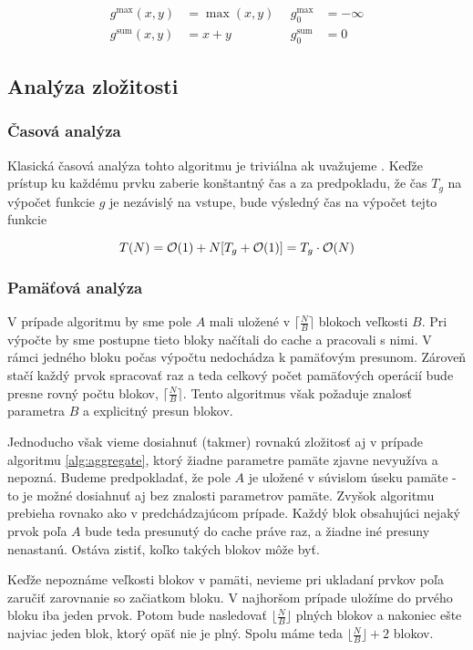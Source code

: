 \[
\begin{aligned}
g^{\textrm{max}}(x, y) &= \max(x, y) ~~ &g^{\textrm{max}}_0 &= -\infty \\
g^{\textrm{sum}}(x,y) &= x+y &g^{\textrm{sum}}_0 &= 0
\end{aligned}
\]


\subsection{Analýza zložitosti}
\subsubsection{Časová analýza}
Klasická časová analýza tohto algoritmu je triviálna ak uvažujeme \RAM. Keďže prístup ku každému prvku  zaberie konštantný čas a za predpokladu, že čas $T_g$ na výpočet funkcie $g$ je nezávislý na vstupe, bude výsledný čas na výpočet tejto funkcie

\[
T(N) = \mathcal{O}(1) + N[T_g + \mathcal{O}(1)] = T_g\cdot\mathcal{O}(N)
\]

\subsubsection{Pamäťová analýza}

V prípade \aware algoritmu by sme pole $A$ mali uložené v $\lceil \frac{N}{B} \rceil$ blokoch veľkosti $B$. Pri výpočte by sme postupne tieto bloky načítali do cache a pracovali s nimi. V rámci jedného bloku počas výpočtu nedochádza k pamäťovým presunom. Zároveň stačí každý prvok spracovať raz a teda celkový počet pamäťových operácií bude presne rovný počtu blokov, $\lceil \frac{N}{B} \rceil$. Tento algoritmus však požaduje znalosť parametra $B$ a explicitný presun blokov.

Jednoducho však vieme dosiahnuť (takmer) rovnakú zložitosť aj v prípade \obliv algoritmu \ref{alg:aggregate}, ktorý žiadne parametre pamäte zjavne nevyužíva a nepozná. Budeme predpokladať, že pole $A$ je uložené v súvislom úseku pamäte - to je možné dosiahnuť aj bez znalosti parametrov pamäte. Zvyšok algoritmu prebieha rovnako ako v predchádzajúcom prípade. Každý blok obsahujúci nejaký prvok poľa $A$ bude teda presunutý do cache práve raz, a žiadne iné presuny nenastanú. Ostáva zistiť, koľko takých blokov môže byť.

Keďže nepoznáme veľkosti blokov v pamäti, nevieme pri ukladaní prvkov poľa zaručiť zarovnanie so začiatkom bloku. V najhoršom prípade uložíme do prvého bloku iba jeden prvok. Potom bude nasledovať $\lfloor \frac{N}{B} \rfloor$ plných blokov a nakoniec ešte najviac jeden blok, ktorý opäť nie je plný. Spolu máme teda $\lfloor \frac{N}{B} \rfloor + 2$ blokov.

